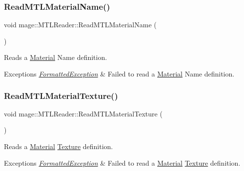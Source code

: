 \subsubsection{\texorpdfstring{Read\+M\+T\+L\+Material\+Name()}{ReadMTLMaterialName()}}
{\footnotesize\ttfamily void mage\+::\+M\+T\+L\+Reader\+::\+Read\+M\+T\+L\+Material\+Name (\begin{DoxyParamCaption}{ }\end{DoxyParamCaption})\hspace{0.3cm}{\ttfamily [private]}}

Reads a \hyperlink{classmage_1_1_material}{Material} Name definition.


\begin{DoxyExceptions}{Exceptions}
{\em \hyperlink{classmage_1_1_formatted_exception}{Formatted\+Exception}} & Failed to read a \hyperlink{classmage_1_1_material}{Material} Name definition. \\
\hline
\end{DoxyExceptions}
\hypertarget{classmage_1_1_m_t_l_reader_ade472b4a528a69ef05f10e83772a9a89}{}\label{classmage_1_1_m_t_l_reader_ade472b4a528a69ef05f10e83772a9a89} 
\subsubsection{\texorpdfstring{Read\+M\+T\+L\+Material\+Texture()}{ReadMTLMaterialTexture()}}
{\footnotesize\ttfamily void mage\+::\+M\+T\+L\+Reader\+::\+Read\+M\+T\+L\+Material\+Texture (\begin{DoxyParamCaption}{ }\end{DoxyParamCaption})\hspace{0.3cm}{\ttfamily [private]}}

Reads a \hyperlink{classmage_1_1_material}{Material} \hyperlink{classmage_1_1_texture}{Texture} definition.


\begin{DoxyExceptions}{Exceptions}
{\em \hyperlink{classmage_1_1_formatted_exception}{Formatted\+Exception}} & Failed to read a \hyperlink{classmage_1_1_material}{Material} \hyperlink{classmage_1_1_texture}{Texture} definition. \\
\hline
\end{DoxyExceptions}
\hypertarget{classmage_1_1_m_t_l_reader_a3c263193e37360194a33404fce986736}{}\label{classmage_1_1_m_t_l_reader_a3c263193e37360194a33404fce986736} 
